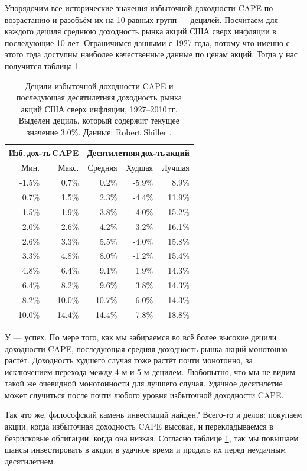 Упорядочим все исторические значения избыточной доходности CAPE по возрастанию 
и разобьём их на 10 равных групп --- децилей. Посчитаем для каждого дециля 
среднюю доходность рынка акций США сверх инфляции в последующие 10 лет. 
Ограничимся данными с 1927 года, потому что именно с этого года доступны 
наиболее качественные данные по ценам акций. Тогда у нас получится таблица 
\ref{cape_excess_yield_and_stock_returns_table}.

\begin{table}[h]
\centering
\begin{tabular}{r|r|r|r|r}
\multicolumn{2}{c|}{Изб.\,дох-ть\,CAPE} &
\multicolumn{3}{c}{Десятилетняя\,дох-ть\,акций} \\
\hline
Мин. & Макс. & Средняя & Худшая & Лучшая \\
\hline
-1.5\% &  0.7\% &  0.2\%  & -5.9\% &  8.9\% \\
 0.7\% &  1.5\% &  2.3\%  & -4.4\% & 11.9\% \\
 1.5\% &  1.9\% &  3.8\%  & -4.0\% & 15.2\% \\
 2.0\% &  2.6\% &  4.2\%  & -3.2\% & 16.1\% \\ 
\hline
 2.6\% &  3.3\% &  5.5\%  & -4.0\% & 15.8\% \\
\hline
 3.3\% &  4.8\% &  8.0\%  & -1.2\% & 15.4\% \\
 4.8\% &  6.4\% &  9.1\%  &  1.9\% & 14.3\% \\
 6.4\% &  8.2\% &  9.6\%  &  3.8\% & 14.3\% \\
 8.2\% & 10.0\% &  10.7\% &  6.0\% & 14.3\% \\ 
10.0\% & 14.4\% &  14.4\% &  7.8\% & 18.8\%  
\end{tabular}
\caption{Децили избыточной доходности CAPE и последующая десятилетняя 
доходность рынка акций США сверх инфляции, 1927--2010\,гг. Выделен дециль, 
который содержит текущее значение 3.0\%. Данные: Robert Shiller 
\cite{shillerOnline}.}
\label{cape_excess_yield_and_stock_returns_table}
\end{table}

У --- успех. По мере того, как мы забираемся во всё более высокие децили 
доходности CAPE, последующая средняя доходность рынка акций монотонно растёт. 
Доходность худшего случая тоже растёт почти монотонно, за исключением перехода 
между 4-м и 5-м децилем. Любопытно, что мы не видим такой же очевидной 
монотонности для лучшего случая. Удачное десятилетие может случиться  
после почти любого уровня избыточной доходности CAPE.

Так что же, философский камень инвестиций найден? Всего-то и делов: покупаем 
акции, когда избыточная доходность CAPE высокая, и перекладываемся в 
безрисковые облигации, когда она низкая. Согласно таблице 
\ref{cape_excess_yield_and_stock_returns_table}, так мы повышаем шансы 
инвестировать в акции в удачное время и продать их перед неудачным 
десятилетием.


